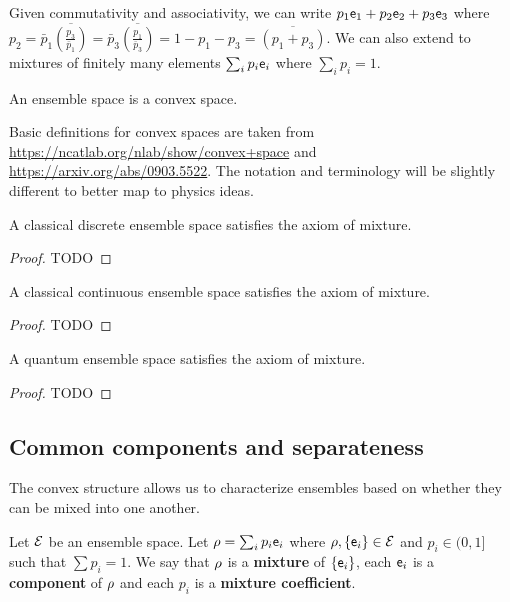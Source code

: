 \begin{remark}
	Given commutativity and associativity, we can write $p_1 \ens_1 + p_2 \ens_2 + p_3 \ens_3$ where $p_2 = \bar{p}_1\overline{\left(\frac{p_3}{\bar{p}_1}\right)} = \bar{p}_3\overline{\left(\frac{p_1}{\bar{p}_3}\right)} = 1 - p_1 - p_3 = \overline{\left(p_1 + p_3\right)}$. We can also extend to mixtures of finitely many elements $\sum_i p_i \ens_i$ where $\sum_i p_i = 1$.
\end{remark}

\begin{coro}
	An ensemble space is a convex space.
\end{coro}

\begin{remark}
	Basic definitions for convex spaces are taken from \url{https://ncatlab.org/nlab/show/convex+space} and \url{https://arxiv.org/abs/0903.5522}. The notation and terminology will be slightly different to better map to physics ideas. 
\end{remark}

\begin{prop}
	A classical discrete ensemble space satisfies the axiom of mixture.
\end{prop}

\begin{proof}
	TODO
\end{proof}

\begin{prop}
	A classical continuous ensemble space satisfies the axiom of mixture.
\end{prop}

\begin{proof}
	TODO
\end{proof}

\begin{prop}
	A quantum ensemble space satisfies the axiom of mixture.
\end{prop}

\begin{proof}
	TODO
\end{proof}

\subsection{Common components and separateness}

The convex structure allows us to characterize ensembles based on whether they can be mixed into one another.

\begin{defn}
	Let $\Ens$ be an ensemble space. Let $\ens[\rho] = \sum_i p_i \ens_i$ where $\ens[\rho], \{\ens_i\} \in \Ens$ and $p_i \in (0,1]$ such that $\sum p_i = 1$. We say that $\ens[\rho]$ is a \textbf{mixture} of $\{\ens_i\}$, each $\ens_i$ is a \textbf{component} of $\ens[\rho]$ and each $p_i$ is a \textbf{mixture coefficient}.
\end{defn}

